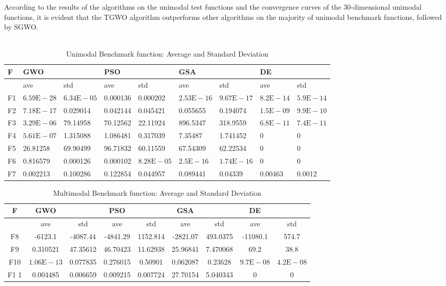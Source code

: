 \documentclass[11pt]{report}
\begin{document}
\par According to the results of the algorithms on the unimodal
test functions and the convergence curves of the
30-dimensional unimodal functions, it is evident that the TGWO algorithm outperforms
other algorithms on the majority of unimodal benchmark
functions, followed by SGWO.
 \\
 \\
 \begin{table}[!h]
 
\begin{tabular}{lllllllll} 
F & GWO & & PSO & & GSA & & DE & \\
\hline & ave & std & ave & std & ave & std & ave & std \\
\cline { 2 - 9 } F1 & $6.59 \mathrm{E}-28$ & $6.34 \mathrm{E}-05$ & 0.000136 & 0.000202 & $2.53 \mathrm{E}-16$ & $9.67 \mathrm{E}-17$ & $8.2 \mathrm{E}-14$ & $5.9 \mathrm{E}-14$ \\
F2 & $7.18 \mathrm{E}-17$ & 0.029014 & 0.042144 & 0.045421 & 0.055655 & 0.194074 & $1.5 \mathrm{E}-09$ & $9.9 \mathrm{E}-10$ \\
F3 & $3.29 \mathrm{E}-06$ & 79.14958 & 70.12562 & 22.11924 & 896.5347 & 318.9559 & $6.8 \mathrm{E}-11$ & $7.4 \mathrm{E}-11$ \\
F4 & $5.61 \mathrm{E}-07$ & 1.315088 & 1.086481 & 0.317039 & 7.35487 & 1.741452 & 0 & 0 \\
F5 & 26.81258 & 69.90499 & 96.71832 & 60.11559 & 67.54309 & 62.22534 & 0 & 0 \\
F6 & 0.816579 & 0.000126 & 0.000102 & $8.28 \mathrm{E}-05$ & $2.5 \mathrm{E}-16$ & $1.74 \mathrm{E}-16$ & 0 & 0 \\
F7 & 0.002213 & 0.100286 & 0.122854 & 0.044957 & 0.089441 & 0.04339 & 0.00463 & 0.0012
\end{tabular}
\caption{Unimodal Benchmark function: Average and Standard Deviation}
\label{std}
\end{table}
\begin{table}[!h]
\begin{tabular}{ccccccccc} 
F & GWO & & PSO & & GSA & & DE & \\
\hline & ave & std & ave & std & ave & std & ave & std \\
\cline { 2 - 9 } F8 & -6123.1 & -4087.44 & -4841.29 & 1152.814 & -2821.07 & 493.0375 & -11080.1 & 574.7 \\
F9 & 0.310521 & 47.35612 & 46.70423 & 11.62938 & 25.96841 & 7.470068 & 69.2 & 38.8 \\
F10 & $1.06 \mathrm{E}-13$ & 0.077835 & 0.276015 & 0.50901 & 0.062087 & 0.23628 & $9.7 \mathrm{E}-08$ & $4.2 \mathrm{E}-08$ \\
F1 1 & 0.004485 & 0.006659 & 0.009215 & 0.007724 & 27.70154 & 5.040343 & 0 & 0
\end{tabular}
\caption{Multimodal Benchmark function: Average and Standard Deviation}
\label{var}
\end{table}
\end{document}
